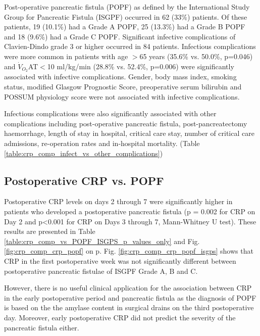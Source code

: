 Post-operative pancreatic fistula (POPF) as defined by the International Study Group for Pancreatic Fistula (ISGPF) occurred in 62 (33\%) patients. 
Of these patients, 19 (10.1\%) had a Grade A POPF, 25 (13.3\%) had a Grade B POPF and 18 (9.6\%) had a Grade C POPF. 
Significant infective complications of Clavien-Dindo grade 3 or higher occurred in 84 patients. 
Infectious complications were more common in patients with age $>$65 years (35.6\% vs. 50.0\%, p=0.046) and $\dot{V}_{O_2}$AT$<$10 ml/kg/min (28.8\% vs. 52.4\%, p=0.006) were significantly associated with infective complications. 
Gender, body mass index, smoking status, modified Glasgow Prognostic Score, preoperative serum bilirubin and POSSUM physiology score were not associated with infective complications.

Infectious complications were also significantly associated with other complications including post-operative pancreatic fistula, post-pancreatectomy haemorrhage, length of stay in hospital, critical care stay, number of critical care admissions, re-operation rates and in-hospital mortality. (Table \ref{table:crp_comp_infect_vs_other_complications})




\subsection{Postoperative CRP vs. POPF}
\label{Postoperative CRP vs. POPF}
Postoperative CRP levels on days 2 through 7 were significantly higher in patients who developed a postoperative pancreatic fistula (p = 0.002 for CRP on Day 2 and p<0.001 for CRP on Days 3 through 7, Mann-Whitney U test). 
These results are presented in Table \ref{table:crp_comp_vs_POPF_ISGPS_p_values_only} and Fig. \ref{fig:crp_comp_crp_popf} on p\pageref{fig:crp_comp_crp_popf}. 
Fig. \ref{fig:crp_comp_crp_popf_isgps} shows that CRP in the first postoperative week was not significantly different between postoperative pancreatic fistulae of ISGPF Grade A, B and C. 

However, there is no useful clinical application for the association between CRP in the early postoperative period and  pancreatic fistula as the diagnosis of POPF is based on the the amylase content in surgical drains on the third postoperative day. 
Moreover, early postoperative CRP did not predict the severity of the pancreatic fistula either.

